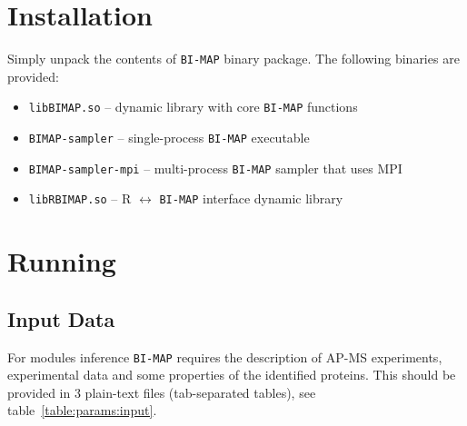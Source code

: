 \documentclass[microtype,a4paper,article,10pt,oneside,final]{memoir}
\newcommand{\bimap}{\texttt{BI-MAP}\xspace}
\begin{document}
\section{Installation}

Simply unpack the contents of \bimap binary package.
The following binaries are provided:
\begin{itemize}
  \item \texttt{libBIMAP.so} -- dynamic library with core \bimap functions
  \item \texttt{BIMAP-sampler} -- single-process \bimap executable
  \item \texttt{BIMAP-sampler-mpi} -- multi-process \bimap sampler that uses MPI
  \item \texttt{libRBIMAP.so} -- R $\leftrightarrow$ \bimap interface dynamic library
\end{itemize}

\section{Running}

\subsection{Input Data}

For modules inference \bimap requires the description of 
AP-MS experiments, experimental data
and some properties of the identified proteins.
This should be provided in 3 plain-text files (tab-separated tables),
see table~\ref{table:params:input}.

\vspace{0.2cm}
\end{document}
